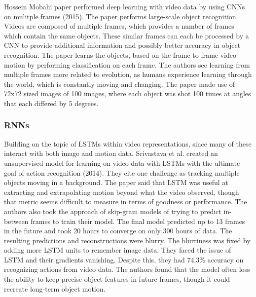 Hossein Mobahi paper performed deep learning with video data by using CNNs on mulitple frames (2015).  The paper performs large-scale object recognition.  Videos are composed of multiple frames, which provides a number of frames which contain the same objects.  These similar frames can each be processed by a CNN to provide additional information and possibly better accuracy in object recognition.  The paper learns the objects, based on the frame-to-frame video motion by performing classification on each frame.  The authors see learning from multiple frames more related to evolution, as humans experience learning through the world, which is constantly moving and changing.  The paper made use of 72x72 sized images of 100 images, where each object was shot 100 times at angles that each differed by 5 degrees.


\subsubsection{RNNs}
Building on the topic of LSTMs within video representations, since many of these interact with both image and motion data.  Srivastava et al. created an unsupervised model for learning on video data with LSTMs with the ultimate goal of action recognition (2014).  They cite one challenge as tracking multiple objects moving in a background.  The paper said that LSTM was useful at extracting and extrapolating motion beyond what the video observed, though that metric seems difficult to measure in terms of goodness or performance. The authors also took the approach of skip-gram models of trying to predict in-between frames to train their model. The final model predicted up to 13 frames in the future and took 20 hours to converge on only 300 hours of data. The resulting predictions and reconstructions were blurry.  The blurriness was fixed by adding more LSTM units to remember image data.  They faced the issue of LSTM and their gradients vanishing.  Despite this, they had 74.3\% accuracy on recognizing actions from video data.  The authors found that the model often loss the ability to keep precise object features in future frames, though it could recreate long-term object motion. 

